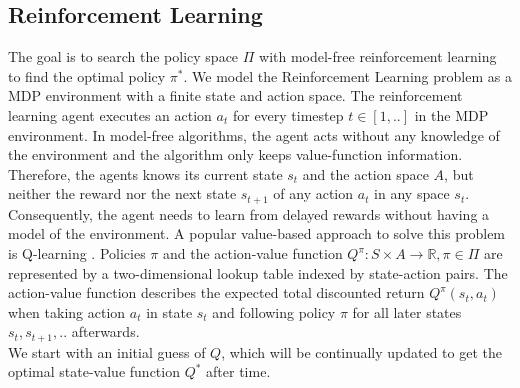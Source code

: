 \subsection{Reinforcement Learning}
\label{reinforcement}
The goal is to search the policy space $\Pi$ with model-free reinforcement learning \cite{strehl09} to find the optimal policy $\pi^*$. We model the Reinforcement Learning problem as a MDP environment with a finite state and action space. The reinforcement learning agent executes an action $a_t$ for every timestep $t \in [1,..]$ in the MDP environment. In model-free algorithms, the agent acts without any knowledge of the environment and the algorithm only keeps value-function information. Therefore, the agents knows its current state $s_t$ and the action space $A$, but neither the reward nor the next state $s_{t+1}$ of any action $a_t$ in any space $s_t$.\\
Consequently, the agent needs to learn from delayed rewards without having a model of the environment. A popular value-based approach to solve this problem is Q-learning \cite{peng04}. Policies $\pi$ and the action-value function $Q^{\pi} : S \times A \rightarrow \mathbb{R},\pi \in \Pi$ are represented by a two-dimensional lookup table indexed by state-action pairs. The action-value function describes the expected total discounted return $Q^{\pi}(s_t,a_t)$ when taking action $a_t$ in state $s_t$ and following policy $\pi$ for all later states $s_t, s_{t+1},..$ afterwards.\\
We start with an initial guess of $Q$, which will be continually updated to get the optimal state-value function $Q^*$ after time.


